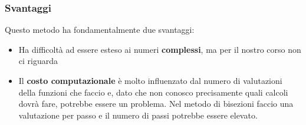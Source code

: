\subsubsection{Svantaggi}
Questo metodo ha fondamentalmente due svantaggi:
\begin{itemize}
	\item Ha difficoltà ad essere esteso ai numeri \textbf{complessi}, ma per il nostro corso non ci riguarda
	\item Il \textbf{costo computazionale} è molto influenzato dal numero di valutazioni della funzioni che faccio e, dato che non conosco precisamente quali calcoli dovrà fare, potrebbe essere un problema. Nel metodo di bisezioni faccio una valutazione per passo e il numero di passi potrebbe essere elevato.
\end{itemize} 
